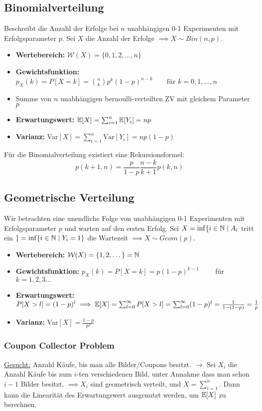 \subsection{Binomialverteilung}
Beschreibt die Anzahl der Erfolge bei $n$ unabhängigen 0-1 Experimenten mit Erfolgsparameter $p$. Sei $X$ die Anzahl der Erfolge $\implies X \sim Bin(n,p)$.
\begin{itemize}
\item \textbf{Wertebereich:} $\mathcal{W}(X) = \{0,1,2,\dots,n\}$
\item \textbf{Gewichtsfunktion:} $p_X(k) = P[X=k] = \binom{n}{k} p^k (1-p)^{n-k} \quad \quad \mbox{für } k = 0,1,\dots, n$
\item Summe von $n$ unabhängigen bernoulli-verteilten ZV mit gleichem Parameter $p$
\item \textbf{Erwartungswert:} $\mathbb{E}[X] = \sum_{i=1}^n \mathbb{E}[Y_i] = np$
\item \textbf{Varianz:} Var$[X] = \sum_{i=1}^n \mbox{Var}[Y_i] = np(1-p)$
\end{itemize}
Für die Binomialverteilung existiert eine Rekursionsformel:
$$p(k+1, n) = \frac{p}{1-p} \frac{n-k}{k+1} p(k,n)$$

\subsection{Geometrische Verteilung}
Wir betrachten eine unendliche Folge von unabhängigen 0-1 Experimenten mit Erfolgsparameter $p$ und warten auf den ersten Erfolg. Sei $X = \inf \{i\in\mathbb{N} \;|\; A_i$ tritt ein $\} = \inf \{i \in \mathbb{N} \;|\; Y_i = 1\}$ die Wartezeit $\implies X \sim Geom(p)$.
\begin{itemize}
\item \textbf{Wertebereich:} $\mathcal{W}(X)=\{1,2,\dots\} = \mathbb{N}$
\item \textbf{Gewichtsfunktion:} $p_X(k) = P[X=k] = p(1-p)^{k-1} \quad \quad $ für $k=1,2,3\dots $
\item \textbf{Erwartungswert:} $P[X > l] = (1-p)^l \implies \mathbb{E}[X] = \sum_{l=0}^\infty P[X>l] = \sum_{l=0}^\infty (1-p)^l = \frac{1}{1-(1-p)} = \frac{1}{p}$
\item \textbf{Varianz:} Var$[X] = \frac{1-p}{p^2}$
\end{itemize}

\begin{mdframed}
\subsubsection*{Coupon Collector Problem}
\underline{Gesucht:} Anzahl Käufe, bis man alle Bilder/Coupons besitzt. $\to$ Sei $X_i$ die Anzahl Käufe bis zum $i$-ten verschiedenen Bild, unter Annahme dass man schon $i-1$ Bilder besitzt. $\implies X_i$ sind geometrisch verteilt, und $X= \sum_{i=1}^n$. Dann kann die Linearität des Erwartungswert ausgenutzt werden, um $\mathbb{E}[X]$ zu berechnen.
\end{mdframed}

